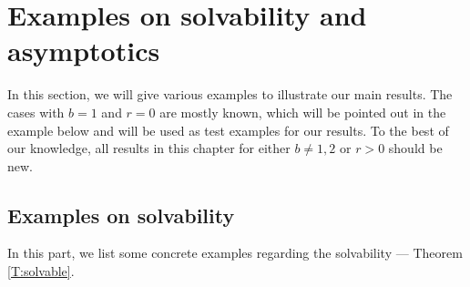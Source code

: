 \documentclass[12pt]{report}
\theoremstyle{plain}
\theoremstyle{definition}
\numberwithin{equation}{section}
\begin{document}
\section{Examples on solvability and asymptotics} \label{S:SolvEx}

In this section, we will give various examples to illustrate our main results. The cases with $b=1$
and $r=0$ are mostly known, which will be pointed out in the example below and will be used as test
examples for our results. To the best of our knowledge, all results in this chapter for either $b\ne
1,2$ or $r>0$ should be new.

\subsection{Examples on solvability}

In this part, we list some concrete examples regarding the solvability --- Theorem \ref{T:solvable}.
\end{document}
